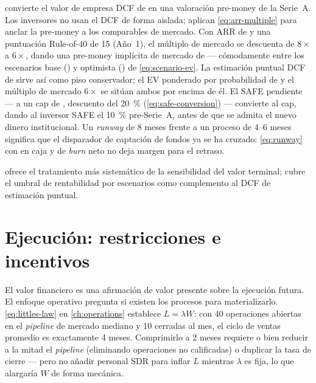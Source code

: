  convierte el valor de empresa DCF de  en
una valoración pre-money de la Serie~A. Los inversores no usan el DCF de forma aislada; aplican
\cref{eq:arr-multiple} para anclar la pre-money a los comparables de mercado. Con ARR de
 y una puntuación Rule-of-40 de 15 (Año~1), el múltiplo de mercado se descuenta
de \(8\times\) a \(6\times\), dando una pre-money implícita de mercado de  ---
cómodamente entre los escenarios base () y optimista () de
\cref{eq:scenario-ev}. La estimación puntual DCF de  sirve así como piso
conservador; el EV ponderado por probabilidad de  y el múltiplo de mercado
\(6\times\) se sitúan ambos por encima de él. El SAFE pendiente ---
 a un cap de , descuento del \qty{20}{\percent}
(\cref{eq:safe-conversion}) --- convierte al cap, dando al inversor SAFE el \qty{10}{\percent}
pre-Serie~A, antes de que se admita el nuevo dinero institucional. Un \emph{runway} de 8 meses
frente a un proceso de 4--6 meses significa que el disparador de captación de fondos ya se ha
cruzado: \cref{eq:runway} con  en caja y  de \emph{burn} neto no
deja margen para el retraso.

\textcite{damodaran2012} ofrece el tratamiento más sistemático de la sensibilidad del valor
terminal; \textcite{brealey2020} cubre el umbral de rentabilidad por escenarios como complemento
al DCF de estimación puntual.

\section{Ejecución: restricciones e incentivos}\label{sec:capstone-execution}

El valor financiero es una afirmación de valor presente sobre la ejecución futura. El enfoque
operativo pregunta si existen los procesos para materializarlo. \cref{eq:littles-law} en
\cref{ch:operations} establece \(L = \lambda W\): con 40 operaciones abiertas en el
\emph{pipeline} de mercado mediano y 10 cerradas al mes, el ciclo de ventas promedio es
exactamente 4 meses. Comprimirlo a 2 meses requiere o bien reducir a la mitad el
\emph{pipeline} (eliminando operaciones no calificadas) o duplicar la tasa de cierre ---
pero no añadir personal SDR para inflar \(L\) mientras \(\lambda\) es fija, lo que
alargaría \(W\) de forma mecánica.

